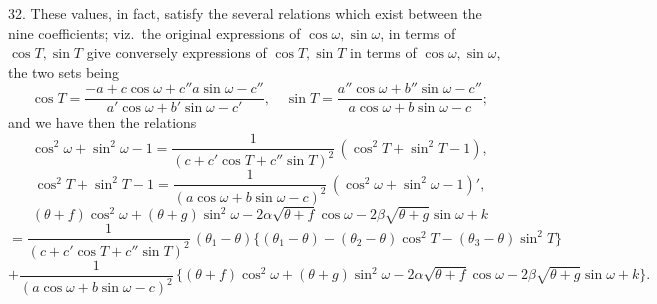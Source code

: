 \documentclass[11pt,a4paper]{article}
\begin{document}
\medskip

32. These values, in fact, satisfy the several relations which exist between the nine coefficients; viz.\ the original expressions of $\cos\omega, \sin\omega$, in terms of $\cos T, \sin T$ give conversely expressions of $\cos T, \sin T$ in terms of $\cos\omega, \sin\omega$, the two sets being
\[
\cos T = \frac{-a + c\cos\omega + c''a\sin\omega - c''}{a'\cos\omega + b'\sin\omega - c'}, \quad \sin T = \frac{a''\cos\omega + b''\sin\omega - c''}{a\cos\omega + b\sin\omega - c};
\]
and we have then the relations
\[
\cos^{2}\omega + \sin^{2}\omega - 1 = \frac{1}{(c + c'\cos T + c''\sin T)^{2}}\,(\cos^{2}T + \sin^{2}T - 1),
\]
\[
\cos^{2}T + \sin^{2}T - 1 = \frac{1}{(a\cos\omega + b\sin\omega - c)^{2}}\,(\cos^{2}\omega + \sin^{2}\omega - 1)',
\]
\[
(\theta + f)\cos^{2}\omega + (\theta + g)\sin^{2}\omega - 2\alpha\sqrt{\theta + f}\cos\omega - 2\beta\sqrt{\theta + g}\sin\omega + k
\]
\[
= \frac{1}{(c + c'\cos T + c''\sin T)^{2}}\,(\theta_{1} - \theta)\{(\theta_{1} - \theta) - (\theta_{2} - \theta)\cos^{2}T - (\theta_{3} - \theta)\sin^{2}T\}
\]
\[
+ \frac{1}{(a\cos\omega + b\sin\omega - c)^{2}}\,\{(\theta + f)\cos^{2}\omega + (\theta + g)\sin^{2}\omega - 2\alpha\sqrt{\theta + f}\cos\omega - 2\beta\sqrt{\theta + g}\sin\omega + k\}.
\]

\newpage

\end{document}
